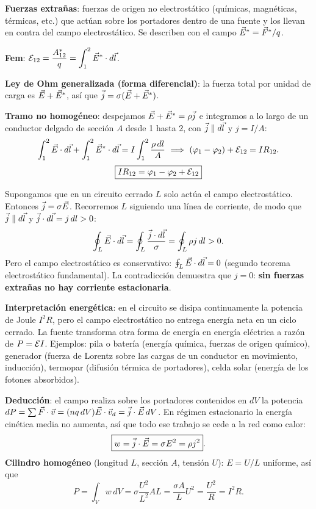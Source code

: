 \textbf{Fuerzas extrañas}: fuerzas de origen no electrostático (químicas, magnéticas, térmicas, etc.) que actúan sobre los portadores dentro de una fuente y los llevan en contra del campo electrostático. Se describen con el campo $\vec{E}^*=\vec F^*/q$.

\textbf{Fem}: $\mathcal{E}_{12}=\dfrac{A^*_{12}}{q}=\displaystyle\int_1^2\vec{E}^*\cdot d\vec l$.

\textbf{Ley de Ohm generalizada (forma diferencial)}: la fuerza total por unidad de carga es $\vec{E}+\vec{E}^*$, así que $\vec{j}=\sigma(\vec{E}+\vec{E}^*)$.

\textbf{Tramo no homogéneo}: despejamos $\vec{E}+\vec{E}^*=\rho\vec{j}$ e integramos a lo largo de un conductor delgado de sección $A$ desde 1 hasta 2, con $\vec{j}\parallel d\vec l$ y $j=I/A$:
\[
\int_1^2\vec{E}\cdot d\vec l+\int_1^2\vec{E}^*\cdot d\vec l=I\int_1^2\frac{\rho\,dl}{A}
\ \Longrightarrow\ (\varphi_1-\varphi_2)+\mathcal{E}_{12}=IR_{12}.
\]
\[
\boxed{IR_{12}=\varphi_1-\varphi_2+\mathcal{E}_{12}}
\]

Supongamos que en un circuito cerrado $L$ solo actúa el campo electrostático. Entonces $\vec{j}=\sigma\vec{E}$. Recorremos $L$ siguiendo una línea de corriente, de modo que $\vec{j}\parallel d\vec l$ y $\vec{j}\cdot d\vec l=j\,dl>0$:
\[
\oint_L\vec{E}\cdot d\vec l=\oint_L\frac{\vec{j}\cdot d\vec l}{\sigma}=\oint_L\rho j\,dl>0.
\]
Pero el campo electrostático es conservativo: $\oint_L\vec{E}\cdot d\vec l=0$ (segundo teorema electrostático fundamental). La contradicción demuestra que $j=0$: \textbf{sin fuerzas extrañas no hay corriente estacionaria}.

\textbf{Interpretación energética}: en el circuito se disipa continuamente la potencia de Joule $I^2R$, pero el campo electrostático no entrega energía neta en un ciclo cerrado. La fuente transforma otra forma de energía en energía eléctrica a razón de $P=\mathcal{E} I$. Ejemplos: pila o batería (energía química, fuerzas de origen químico), generador (fuerza de Lorentz sobre las cargas de un conductor en movimiento, inducción), termopar (difusión térmica de portadores), celda solar (energía de los fotones absorbidos).

\textbf{Deducción}: el campo realiza sobre los portadores contenidos en $dV$ la potencia $dP=\sum\vec F\cdot\vec v=(nq\,dV)\vec{E}\cdot\vec v_d=\vec{j}\cdot\vec{E}\,dV$. En régimen estacionario la energía cinética media no aumenta, así que todo ese trabajo se cede a la red como calor:
\[
\boxed{w=\vec{j}\cdot\vec{E}=\sigma E^2=\rho j^2}.
\]
\textbf{Cilindro homogéneo} (longitud $L$, sección $A$, tensión $U$): $E=U/L$ uniforme, así que
\[
P=\int_Vw\,dV=\sigma\frac{U^2}{L^2}AL=\frac{\sigma A}{L}U^2=\frac{U^2}{R}=I^2R.
\]

